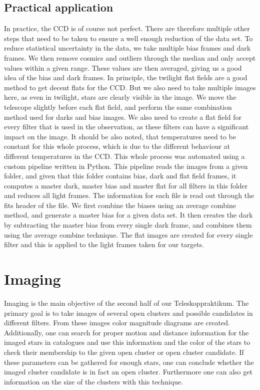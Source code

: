 \documentclass{article}
\begin{document}
\subsection{Practical application}
In practice, the CCD is of course not perfect. There are therefore multiple other steps that need to be taken to ensure a well enough reduction of the data set. To reduce statistical uncertainty in the data, we take multiple bias frames and dark frames. We then remove cosmics and outliers through the median and only accept values within a given range. These values are then averaged, giving us a good idea of the bias and dark frames. \newline
In principle, the twilight flat fields are a good method to get decent flats for the CCD. But we also need to take multiple images here, as even in twilight, stars are clearly visible in the image. We move the telescope slightly before each flat field, and perform the same combination method used for darks and bias images. We also need to create a flat field for every filter that is used in the observation, as these filters can have a significant impact on the image. It should be also noted, that temperatures need to be constant for this whole process, which is due to the different behaviour at different temperatures in the CCD.\newline
This whole process was automated using a custom pipeline written in Python. This pipeline reads the images from a given folder, and given that this folder contains bias, dark and flat field frames, it computes a master dark, master bias and master flat for all filters in this folder and reduces all light frames. The information for each file is read out through the fits header of the file. We first combine the biases using an average combine method, and generate a master bias for a given data set. It then creates the dark by subtracting the master bias from every single dark frame, and combines them using the average combine technique. The flat images are created for every single filter and this is applied to the light frames taken for our targets.

\section{Imaging}\label{sec:imaging}

Imaging is the main objective of the second half of our \ldq Teleskoppraktikum\rdq. The primary goal is to take images of several open clusters and possible candidates in different filters. From these images color magnitude diagrams are created. Additionally, one can search for proper motion and distance information for the imaged stars in catalogues and use this information and the color of the stars to check their membership to the given open cluster or open cluster candidate. If these parameters can be gathered for enough stars, one can conclude whether the imaged cluster candidate is in fact an open cluster. Furthermore one can also get information on the size of the clusters with this technique. 
\end{document}
